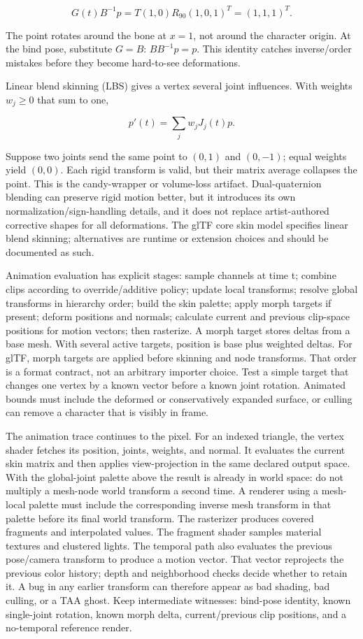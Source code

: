 \[
G(t)B^{-1}p=T(1,0)R_{90}(1,0,1)^T=(1,1,1)^T.
\]

The point rotates around the bone at \(x=1\), not around the character origin. At the bind pose, substitute \(G=B\): \(BB^{-1}p=p\). This identity catches inverse/order mistakes before they become hard-to-see deformations.

Linear blend skinning (LBS) gives a vertex several joint influences. With weights \(w_j\ge0\) that sum to one,

\[
p'(t)=\sum_jw_jJ_j(t)p.
\]

Suppose two joints send the same point to \((0,1)\) and \((0,-1)\); equal weights yield \((0,0)\). Each rigid transform is valid, but their matrix average collapses the point. This is the candy-wrapper or volume-loss artifact. Dual-quaternion blending can preserve rigid motion better, but it introduces its own normalization/sign-handling details, and it does not replace artist-authored corrective shapes for all deformations. The glTF core skin model specifies linear blend skinning; alternatives are runtime or extension choices and should be documented as such.

Animation evaluation has explicit stages: sample channels at time t; combine clips according to override/additive policy; update local transforms; resolve global transforms in hierarchy order; build the skin palette; apply morph targets if present; deform positions and normals; calculate current and previous clip-space positions for motion vectors; then rasterize. A morph target stores deltas from a base mesh. With several active targets, position is base plus weighted deltas. For glTF, morph targets are applied before skinning and node transforms. That order is a format contract, not an arbitrary importer choice. Test a simple target that changes one vertex by a known vector before a known joint rotation. Animated bounds must include the deformed or conservatively expanded surface, or culling can remove a character that is visibly in frame.

The animation trace continues to the pixel. For an indexed triangle, the vertex shader fetches its position, joints, weights, and normal. It evaluates the current skin matrix and then applies view-projection in the same declared output space. With the global-joint palette above the result is already in world space: do not multiply a mesh-node world transform a second time. A renderer using a mesh-local palette must include the corresponding inverse mesh transform in that palette before its final world transform. The rasterizer produces covered fragments and interpolated values. The fragment shader samples material textures and clustered lights. The temporal path also evaluates the previous pose/camera transform to produce a motion vector. That vector reprojects the previous color history; depth and neighborhood checks decide whether to retain it. A bug in any earlier transform can therefore appear as bad shading, bad culling, or a TAA ghost. Keep intermediate witnesses: bind-pose identity, known single-joint rotation, known morph delta, current/previous clip positions, and a no-temporal reference render.

